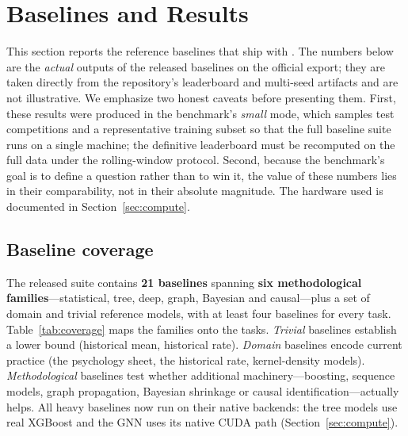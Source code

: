 \section{Baselines and Results}
\label{sec:results}

This section reports the reference baselines that ship with \wcabench. The
numbers below are the \emph{actual} outputs of the released baselines on the
official export; they are taken directly from the repository's leaderboard and
multi-seed artifacts and are not illustrative. We emphasize two honest caveats
before presenting them. First, these results were produced in the benchmark's
\emph{small} mode, which samples test competitions and a representative
training subset so that the full baseline suite runs on a single machine; the
definitive leaderboard must be recomputed on the full data under the
rolling-window protocol. Second, because the benchmark's goal is to define a
question rather than to win it, the value of these numbers lies in their
comparability, not in their absolute magnitude. The hardware used is documented
in Section~\ref{sec:compute}.

\subsection{Baseline coverage}
\label{sec:results-taxonomy}

The released suite contains \textbf{21 baselines} spanning \textbf{six
methodological families}---statistical, tree, deep, graph, Bayesian and
causal---plus a set of domain and trivial reference models, with at least four
baselines for every task. Table~\ref{tab:coverage} maps the families onto the
tasks. \emph{Trivial} baselines establish a lower bound (historical mean,
historical rate). \emph{Domain} baselines encode current practice (the \wca{}
psychology sheet, the historical \DNF{} rate, kernel-density models).
\emph{Methodological} baselines test whether additional
machinery---boosting, sequence models, graph propagation, Bayesian shrinkage or
causal identification---actually helps. All heavy baselines now run on their
native backends: the tree models use real XGBoost and the GNN uses its native
CUDA path (Section~\ref{sec:compute}).

